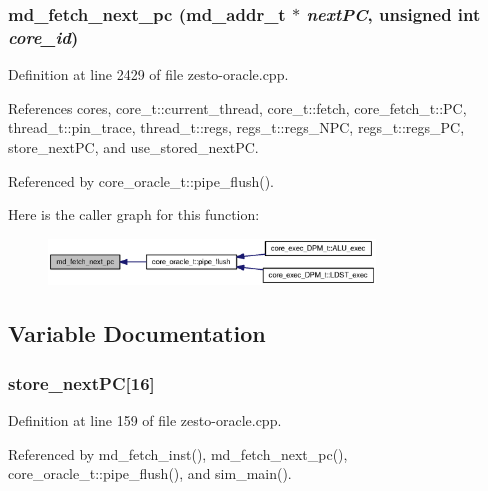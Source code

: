 \subsubsection[{md\_\-fetch\_\-next\_\-pc}]{ md\_\-fetch\_\-next\_\-pc ({\bf md\_\-addr\_\-t} $\ast$ {\em nextPC}, \/  unsigned int {\em core\_\-id})}\label{zesto-oracle_8cpp_4603dc5f3e60fbfcd30343123777d18c}




Definition at line 2429 of file zesto-oracle.cpp.

References cores, core\_\-t::current\_\-thread, core\_\-t::fetch, core\_\-fetch\_\-t::PC, thread\_\-t::pin\_\-trace, thread\_\-t::regs, regs\_\-t::regs\_\-NPC, regs\_\-t::regs\_\-PC, store\_\-nextPC, and use\_\-stored\_\-nextPC.

Referenced by core\_\-oracle\_\-t::pipe\_\-flush().

Here is the caller graph for this function:\nopagebreak
\begin{figure}[H]
\begin{center}
\leavevmode
\includegraphics[width=246pt]{zesto-oracle_8cpp_4603dc5f3e60fbfcd30343123777d18c_icgraph}
\end{center}
\end{figure}


\subsection{Variable Documentation}
\subsubsection[{store\_\-nextPC}]{ {\bf store\_\-nextPC}[16]}\label{zesto-oracle_8cpp_87de3dd0dc95ac44e817dc0f7c7ba3d7}




Definition at line 159 of file zesto-oracle.cpp.

Referenced by md\_\-fetch\_\-inst(), md\_\-fetch\_\-next\_\-pc(), core\_\-oracle\_\-t::pipe\_\-flush(), and sim\_\-main().
